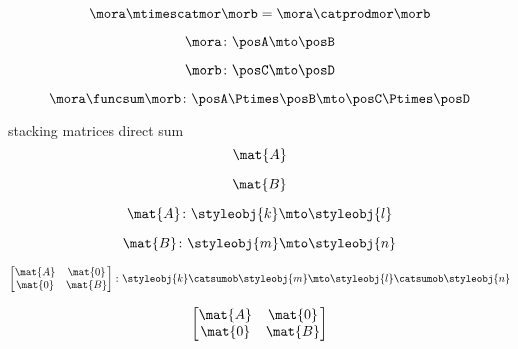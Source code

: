 \begin{forslides}
    \begin{equation}
        \label{eq:combination-020}
        \mora \mtimescatmor \morb = \mora \catprodmor \morb
    \end{equation}

    \begin{equation}
        \label{eq:combination-021}
        \mora \colon \posA \mto \posB
    \end{equation}

    \begin{equation}
        \label{eq:combination-022}
        \morb \colon \posC \mto \posD
    \end{equation}

    \begin{equation}
        \label{eq:combination-023}
        \mora \funcsum \morb \colon \posA \Ptimes \posB \mto \posC \Ptimes \posD
    \end{equation}

stacking matrices direct sum
    \begin{equation}
        \label{eq:combination-024}
        \mat{A}
    \end{equation}

    \begin{equation}
        \label{eq:combination-025}
        \mat{B}
    \end{equation}

    \begin{equation}
        \label{eq:combination-026}
        \mat{A} \colon \styleobj{k} \mto \styleobj{l}
    \end{equation}

    \begin{equation}
        \label{eq:combination-027}
        \mat{B} \colon \styleobj{m} \mto \styleobj{n}
    \end{equation}

    \begin{equation}
        \label{eq:combination-028}
        \begin{bmatrix}
        \mat{A} & \mat{0} \\
        \mat{0} & \mat{B} 
        \end{bmatrix}
        \colon \styleobj{k} \catsumob \styleobj{m} \mto \styleobj{l} \catsumob \styleobj{n}
    \end{equation}
    
    \begin{equation}
        \label{eq:combination-029}
        \begin{bmatrix}
        \mat{A} & \mat{0} \\
        \mat{0} & \mat{B} 
        \end{bmatrix}
    \end{equation}


\end{forslides}
